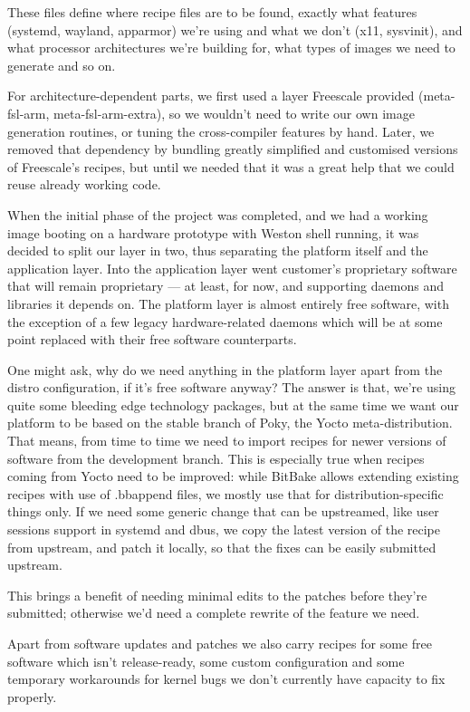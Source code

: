 \documentclass[10pt, a5paper]{article}
\begin{document}
These files define where recipe files are to be found, exactly what features (systemd, wayland, apparmor) we're using and what we don't (x11, sysvinit), and what processor architectures we're building for, what types of images we need to generate and so on.

For architecture-dependent parts, we first used a layer Freescale provided (meta-fsl-arm, meta-fsl-arm-extra), so we wouldn't need to write our own image generation routines, or tuning the cross-compiler features by hand. Later, we removed that dependency by bundling greatly simplified and customised versions of Freescale's recipes, but until we needed that it was a great help that we could reuse already working code.

When the initial phase of the project was completed, and we had a working image booting on a hardware prototype with Weston shell running, it was decided to split our layer in two, thus separating the platform itself and the application layer. Into the application layer went customer's proprietary software that will remain proprietary — at least, for now, and supporting daemons and libraries it depends on. The platform layer is almost entirely free software, with the exception of a few legacy hardware-related daemons which will be at some point replaced with their free software counterparts.

One might ask, why do we need anything in the platform layer apart from the distro configuration, if it's free software anyway? The answer is that, we're using quite some bleeding edge technology packages, but at the same time we want our platform to be based on the stable branch of Poky, the Yocto meta-distribution. That means, from time to time we need to import recipes for newer versions of software from the development branch. This is especially true when recipes coming from Yocto need to be improved: while BitBake allows extending existing recipes with use of .bbappend files, we mostly use that for distribution-specific things only. If we need some generic change that can be upstreamed, like user sessions support in systemd and dbus, we copy the latest version of the recipe from upstream, and patch it locally, so that the fixes can be easily submitted upstream.

This brings a benefit of needing minimal edits to the patches before they're submitted; otherwise we'd need a complete rewrite of the feature we need.

Apart from software updates and patches we also carry recipes for some free software which isn't release-ready, some custom configuration and some temporary workarounds for kernel bugs we don't currently have capacity to fix properly.
\end{document}

